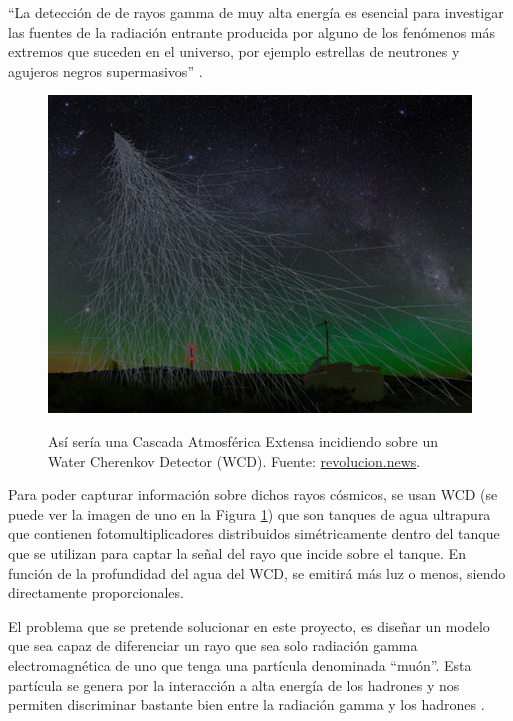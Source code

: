 \enquote{La detección de de rayos gamma de muy alta energía es esencial para investigar las fuentes de la radiación entrante producida por alguno de los fenómenos más extremos que suceden en el universo, por ejemplo estrellas de neutrones y agujeros negros supermasivos} \cite{gonzalez2021tackling}.

\begin{figure}[H]
	\includegraphics[scale=.3]{imagenes/01_Introduccion/EAS.jpg}
	\centering
	\label{fig:wcd}
	\caption{Así sería una Cascada Atmosférica Extensa incidiendo sobre un Water Cherenkov Detector (WCD). Fuente: \href{https://revolucion.news/cienciario.mx/los-rayos-cosmicos-de-muy-alta-energia-vienen-de-fuera-de-la-via-lactea/}{revolucion.news}.}
\end{figure}

Para poder capturar información sobre dichos rayos cósmicos, se usan WCD (se puede ver la imagen de uno en la Figura \ref{fig:wcd}) que son tanques de agua ultrapura que contienen fotomultiplicadores distribuidos simétricamente dentro del tanque que se utilizan para captar la señal del rayo que incide sobre el tanque. En función de la profundidad del agua del WCD, se emitirá más luz o menos, siendo directamente proporcionales.\newline

El problema que se pretende solucionar en este proyecto, es diseñar un modelo que sea capaz de diferenciar un rayo que sea solo radiación gamma electromagnética de uno que tenga una partícula denominada \enquote{muón}. Esta partícula se genera por la interacción a alta energía de los hadrones y nos permiten discriminar bastante bien entre la radiación gamma y los hadrones \cite{gonzalez2021tackling}.

